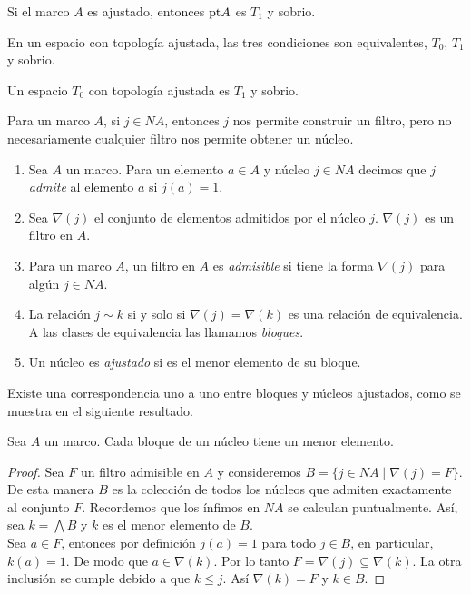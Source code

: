 \begin{lem}
    Si el marco $A$ es ajustado, entonces $\mathrm{pt} A$ es $T_1$ y sobrio.
\end{lem}

\begin{lem}
    En un espacio con topología ajustada, las tres condiciones son equivalentes, $T_0$, $T_1$ y sobrio.
\end{lem}

\begin{cor}
    Un espacio $T_0$ con topología ajustada es $T_1$ y sobrio.
\end{cor}

Para un marco $A$, si $j\in NA$, entonces $j$ nos permite construir un filtro, pero no necesariamente cualquier filtro nos permite obtener un núcleo.

\begin{dfn}\label{Filtroadmisible}
    \begin{enumerate}
        \item Sea $A$ un marco. Para un elemento $a\in A$ y núcleo $j\in NA$ decimos que $j$ \emph{admite} al elemento $a$ si $j(a)=1$.

        \item Sea $\nabla (j)$ el conjunto de elementos admitidos por el núcleo $j$. $\nabla(j)$ es un filtro en $A$.

        \item Para un marco $A$, un filtro en $A$ es \emph{admisible} si tiene la forma $\nabla(j)$ para algún $j\in NA$.

        \item La relación $j\sim k$ si y solo si $\nabla(j)=\nabla(k)$ es una relación de equivalencia. A las clases de equivalencia las llamamos \emph{bloques}.

        \item Un núcleo es \emph{ajustado} si es el menor elemento de su bloque.
    \end{enumerate}
\end{dfn}

Existe una correspondencia uno a uno entre bloques y núcleos ajustados, como se muestra en el siguiente resultado.

\begin{lem}\label{Menorelemento}
    Sea $A$ un marco. Cada bloque de un núcleo tiene un menor elemento.
\end{lem}

\begin{proof}
    Sea $F$ un filtro admisible en $A$ y consideremos $B=\{j\in NA\mid \nabla(j)=F\}$. De esta manera $B$ es la colección de todos los núcleos que admiten exactamente al conjunto $F$. Recordemos que los ínfimos en $NA$ se calculan puntualmente. Así, sea $k=\bigwedge B$ y $k$ es el menor elemento de $B$.\\

    Sea $a\in F$, entonces por definición $j(a)=1$ para todo $j\in B$, en particular, $k(a)=1$. De modo que $a\in \nabla(k)$. Por lo tanto $F=\nabla(j)\subseteq \nabla(k)$. La otra inclusión se cumple debido a que $k\leq j$. Así $\nabla(k)=F$ y $k\in B$.
\end{proof}

